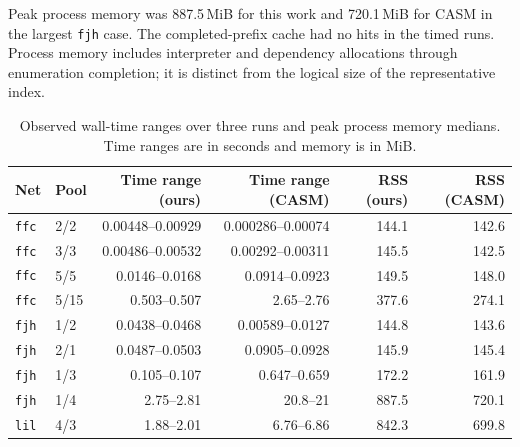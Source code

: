 \documentclass[a5paper, 10pt]{article}
\begin{document}
Peak process memory was 887.5\,MiB for this work and 720.1\,MiB for CASM in the largest \texttt{fjh} case. The completed-prefix cache had no hits in the timed runs. Process memory includes interpreter and dependency allocations through enumeration completion; it is distinct from the logical size of the representative index.

\begin{table}[H]
\centering\scriptsize
\setlength{\tabcolsep}{1mm}
\caption{Observed wall-time ranges over three runs and peak process memory medians. Time ranges are in seconds and memory is in MiB.}
\begin{tabular}{llrrrr}
\toprule
Net & Pool & Time range (ours) & Time range (CASM) & RSS (ours) & RSS (CASM) \\
\midrule
\texttt{ffc} & 2/2 & 0.00448--0.00929 & 0.000286--0.00074 & 144.1 & 142.6 \\
\texttt{ffc} & 3/3 & 0.00486--0.00532 & 0.00292--0.00311 & 145.5 & 142.5 \\
\texttt{ffc} & 5/5 & 0.0146--0.0168 & 0.0914--0.0923 & 149.5 & 148.0 \\
\texttt{ffc} & 5/15 & 0.503--0.507 & 2.65--2.76 & 377.6 & 274.1 \\
\texttt{fjh} & 1/2 & 0.0438--0.0468 & 0.00589--0.0127 & 144.8 & 143.6 \\
\texttt{fjh} & 2/1 & 0.0487--0.0503 & 0.0905--0.0928 & 145.9 & 145.4 \\
\texttt{fjh} & 1/3 & 0.105--0.107 & 0.647--0.659 & 172.2 & 161.9 \\
\texttt{fjh} & 1/4 & 2.75--2.81 & 20.8--21 & 887.5 & 720.1 \\
\texttt{lil} & 4/3 & 1.88--2.01 & 6.76--6.86 & 842.3 & 699.8 \\
\bottomrule
\end{tabular}
\end{table}
\end{document}
